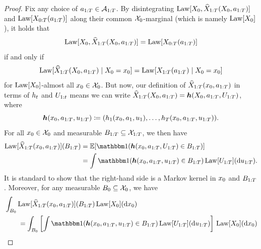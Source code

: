 \begin{proof}
Fix any choice of $a_{1:T} \in \mathcal{A}_{1:T}$.
By disintegrating $\mathrm{Law}[X_0, \widehat{X}_{1:T}(X_0, a_{1:T})]$ and $\mathrm{Law}[X_{0:T}(a_{1:T})]$ along their common $\mathcal{X}_0$-marginal (which is namely $\mathrm{Law}[X_0]$), it holds that
\begin{equation} \label{eq:interventional-correctness-alternative}
    \mathrm{Law}[X_0, \widehat{X}_{1:T}(X_0, a_{1:T})] = \mathrm{Law}[X_{0:T}(a_{1:T})]
\end{equation}
if and only if
\begin{equation} \label{eq:joint-interventional-correctness-proof-intermediate-step}
    \mathrm{Law}[\widehat{X}_{1:T}(X_0, a_{1:T}) \mid X_0 = x_0] = \mathrm{Law}[X_{1:T}(a_{1:T}) \mid X_0 = x_0]
\end{equation}
for $\mathrm{Law}[X_0]$-almost all $x_0 \in \mathcal{X}_0$.
But now, our definition of $\widehat{X}_{1:T}(x_0, a_{1:T})$ in terms of $h_t$ and $U_{1:t}$ means we can write $\widehat{X}_{1:T}(X_0, a_{1:T}) = \boldsymbol{h}(X_0, a_{1:T}, U_{1:T})$,
where
\[
    \boldsymbol{h}(x_0, a_{1:T}, u_{1:T}) \coloneqq (h_1(x_0, a_1, u_1), \ldots, h_T(x_0, a_{1:T}, u_{1:T})).
\]
For all $x_0 \in \mathcal{X}_0$ and measurable $B_{1:T} \subseteq \mathcal{X}_{1:T}$, we then have
\begin{align*}
    \Law[\Xt_{1:\T}(\xx_0, \ax_{1:\T})](\B_{1:\T}) &= \E[\ind(\boldsymbol{\twinfunction}(\xx_0, \ax_{1:\T}, \twinnoise_{1:\T}) \in \B_{1:\T})] \\
    &= \int \ind(\boldsymbol{\twinfunction}(\xx_0, \ax_{1:\T}, \ux_{1:\T}) \in \B_{1:\T}) \, \Law[\twinnoise_{1:\T}](\dee \ux_{1:\T}).
\end{align*}
It is standard to show that the right-hand side is a Markov kernel in $x_0$ and $B_{1:T}$.
Moreover, for any measurable $B_0 \subseteq \mathcal{X}_0$, we have
\begin{align*}
    &\int_{\B_0} \Law[\Xt_{1:\T}(\xx_0, \ax_{1:\T})](\B_{1:\T}) \, \Law[\X_0](\dee \xx_0) \\
        &\qquad= \int_{\B_0} \left[\int \ind(\boldsymbol{\twinfunction}(\xx_0, \ax_{1:\T}, \ux_{1:\T}) \in \B_{1:\T}) \, \Law[\twinnoise_{1:\T}](\dee \ux_{1:\T}) \right] \, \Law[\X_0](\dee \xx_0) \\

\end{align*}
\end{proof}

